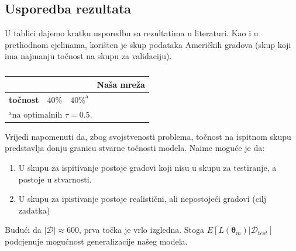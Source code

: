 \documentclass[conference]{IEEEtran}
\begin{document}
\subsection{Usporedba rezultata}
U tablici dajemo kratku usporedbu sa rezultatima u literaturi.
Kao i u prethodnom cjelinama, korišten je skup podataka Američkih gradova (skup koji ima najmanju točnost na skupu za validaciju).
\begin{table}[H]
\caption{ }
\begin{center}
\begin{tabular}{|c|c|c|c|}
\hline
 & \textbf{\cite{randolph}} & \textbf{\cite{name_generator}} & \textbf{Naša mreža}  \\ \hline
\textbf{točnost} & $40\%$ & $40\%^{\mathrm{a}}$ &  \\ \hline
\multicolumn{4}{l}{$^{\mathrm{a}}$na optimalnih $\tau=0.5$.}
\end{tabular}
\label{tab:result}
\end{center}
\end{table}

Vrijedi napomenuti da, zbog svojstvenosti problema, točnost na ispitnom skupu predstavlja donju granicu stvarne točnosti modela. Naime moguće je da:
\begin{enumerate}
\item U skupu za ispitivanje postoje gradovi koji nisu u skupu za testiranje, a postoje u stvarnosti.
\item U skupu za ipistivanje postoje realistični, ali nepostojeći gradovi (cilj zadatka)
\end{enumerate}
Budući da $\lvert \mathcal{D} \rvert \approx 600$, prva točka je vrlo izgledna. Stoga $E[L(\mathbf{\boldsymbol{\theta}}_m) | \mathcal{D}_{test}]$ podcjenuje mogućnost generalizacije našeg modela.
\end{document}
